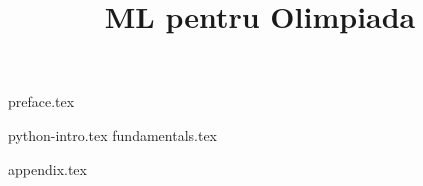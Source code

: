 \documentclass[12pt,openany]{book}
\title{ML pentru Olimpiada}
\author{}
\date{}
\begin{document}
\pagestyle{plain}

\hypersetup{pageanchor=false}
\begin{titlepage}
\maketitle
\end{titlepage}
\hypersetup{pageanchor=true}
\cleardoublepage


\mainmatter

{preface.tex}

\begingroup
\hypersetup{hidelinks}
\tableofcontents
\endgroup

\cleardoublepage

{python-intro.tex}
{fundamentals.tex}

{appendix.tex}
\end{document}
